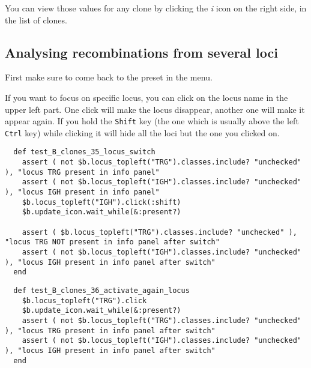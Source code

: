 You can view those values for any clone by clicking the \textit{i} icon on the
right side, in the list of clones.
\subsection{Analysing recombinations from several loci}

First make sure to come back to the preset  in the  menu.

If you want to focus on specific locus, you can click on the locus name in
the upper left part. One click will make the locus disappear, another one will
make it appear again.
If you hold the \texttt{Shift} key (the one which is usually above the left
\texttt{Ctrl} key) while clicking it will hide all the loci but the one you
clicked on.

\begin{verbatim}
  def test_B_clones_35_locus_switch
    assert ( not $b.locus_topleft("TRG").classes.include? "unchecked" ), "locus TRG present in info panel"
    assert ( not $b.locus_topleft("IGH").classes.include? "unchecked" ), "locus IGH present in info panel"
    $b.locus_topleft("IGH").click(:shift)
    $b.update_icon.wait_while(&:present?)

    assert ( $b.locus_topleft("TRG").classes.include? "unchecked" ), "locus TRG NOT present in info panel after switch"
    assert ( not $b.locus_topleft("IGH").classes.include? "unchecked" ), "locus IGH present in info panel after switch"
  end
\end{verbatim}

\begin{verbatim}
  def test_B_clones_36_activate_again_locus
    $b.locus_topleft("TRG").click
    $b.update_icon.wait_while(&:present?)
    assert ( not $b.locus_topleft("TRG").classes.include? "unchecked" ), "locus TRG present in info panel after switch"
    assert ( not $b.locus_topleft("IGH").classes.include? "unchecked" ), "locus IGH present in info panel after switch"
  end
\end{verbatim}

